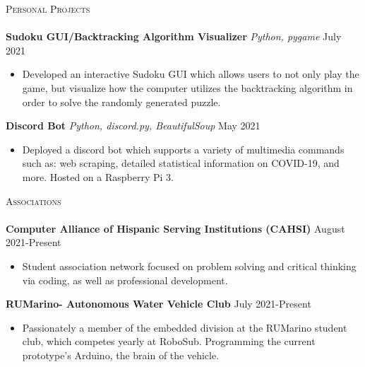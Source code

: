 \documentclass[a4paper]{article}
\newcommand{\lineunder} {
    \vspace*{-8pt} \\
    \hspace*{-18pt} \hrulefill \\
}
\newcommand{\header} [1] {
    {\hspace*{-18pt}\vspace*{6pt} \textsc{#1}}
    \vspace*{-6pt} \lineunder
}
\begin{document}
\header{Personal Projects}

{\textbf{Sudoku GUI/Backtracking Algorithm Visualizer}} {\sl Python, pygame} \hfill July 2021  \\
\vspace{-1.5mm}

\begin{itemize} \itemsep -1pt
\item Developed an interactive Sudoku GUI which allows users to not only play the game, but visualize how the computer utilizes the backtracking algorithm in order to solve the randomly generated puzzle.
\end{itemize}

\vspace*{-1mm}
{\textbf{Discord Bot}} {\sl Python, discord.py, BeautifulSoup} \hfill May 2021 \\
\vspace{-2.5mm}

\begin{itemize} \itemsep -1pt
\item Deployed a discord bot which supports a variety of multimedia commands such as: web scraping, detailed statistical information on COVID-19, and more. Hosted on a Raspberry Pi 3.\\
\end{itemize}
\vspace*{1mm}

\header{Associations}

\vspace{-1mm} \textbf{Computer Alliance of Hispanic Serving Institutions (CAHSI)} \hfill August 2021-Present\\
\begin{itemize} \itemsep -1pt
\vspace{-2mm}
\item Student association network focused on problem solving and critical thinking via coding, as well as professional development. \\
\end{itemize}

\vspace{-0.5mm}
\textbf{RUMarino- Autonomous Water Vehicle Club} \hfill July 2021-Present \\ 
\vspace{-2mm}
\begin{itemize} \itemsep -1pt
\item Passionately a member of the embedded division at the RUMarino student club, which competes yearly at RoboSub. Programming the current prototype's Arduino, the brain of the vehicle.\\ 
\end{itemize}
 


\ 
\end{document}
